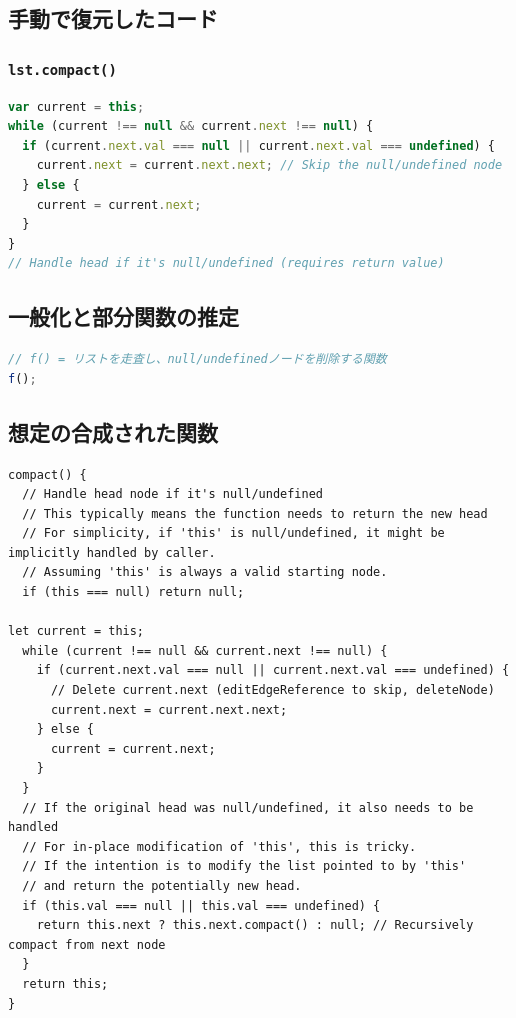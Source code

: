 \documentclass{article}
\begin{document}
\subsection{手動で復元したコード}

\subsubsection{\texttt{lst.compact()}}
\begin{lstlisting}[language=JavaScript]
var current = this;
while (current !== null && current.next !== null) {
  if (current.next.val === null || current.next.val === undefined) {
    current.next = current.next.next; // Skip the null/undefined node
  } else {
    current = current.next;
  }
}
// Handle head if it's null/undefined (requires return value)
\end{lstlisting}

\subsection{一般化と部分関数の推定}

\begin{lstlisting}[language=JavaScript]
// f() = リストを走査し、null/undefinedノードを削除する関数
f();
\end{lstlisting}

\subsection{想定の合成された関数}
\begin{lstlisting}
compact() {
  // Handle head node if it's null/undefined
  // This typically means the function needs to return the new head
  // For simplicity, if 'this' is null/undefined, it might be implicitly handled by caller.
  // Assuming 'this' is always a valid starting node.
  if (this === null) return null;

let current = this;
  while (current !== null && current.next !== null) {
    if (current.next.val === null || current.next.val === undefined) {
      // Delete current.next (editEdgeReference to skip, deleteNode)
      current.next = current.next.next;
    } else {
      current = current.next;
    }
  }
  // If the original head was null/undefined, it also needs to be handled
  // For in-place modification of 'this', this is tricky.
  // If the intention is to modify the list pointed to by 'this'
  // and return the potentially new head.
  if (this.val === null || this.val === undefined) {
    return this.next ? this.next.compact() : null; // Recursively compact from next node
  }
  return this;
}
\end{lstlisting}
\end{document}
